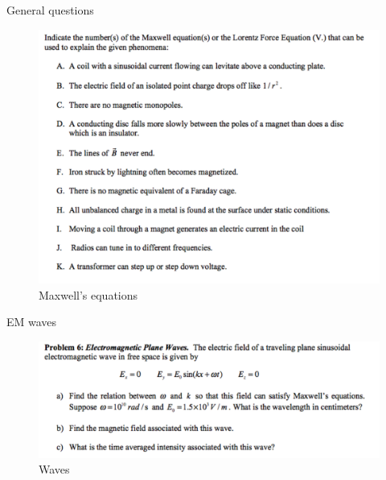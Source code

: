 \documentclass[makesolutionspdf]{esg8022pset}
\begin{document}
\begin{problem}{General questions}
\begin{figure}[H]
    \centering
    \includegraphics[width = 15cm]{max_gen}
    \caption{Maxwell's equations}
  \end{figure}
\end{problem}

\begin{problem}{EM waves}
\begin{figure}[H]
    \centering
    \includegraphics[width = 15cm]{waves1}
    \caption{Waves}
  \end{figure}
\end{problem}
\end{document}
